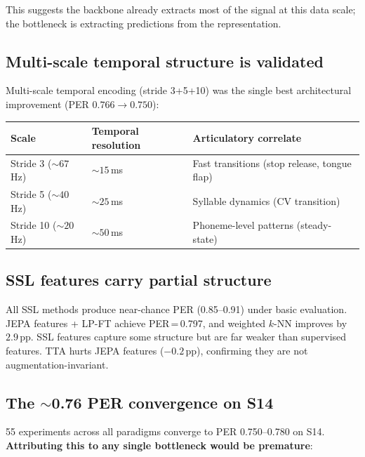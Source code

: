 \documentclass[11pt,letterpaper]{article}
\newcommand{\pp}{\,\text{pp}}
\begin{document}
\noindent This suggests the backbone already extracts most of the signal at this data scale; the bottleneck is extracting predictions from the representation.

\subsection{Multi-scale temporal structure is validated}

Multi-scale temporal encoding (stride 3+5+10) was the single best architectural improvement (PER $0.766 \to 0.750$):

\begin{table}[h]
\centering\small
\begin{tabular}{@{}lll@{}}
\toprule
\textbf{Scale} & \textbf{Temporal resolution} & \textbf{Articulatory correlate} \\
\midrule
Stride 3 (${\sim}67$\,Hz) & ${\sim}15$\,ms & Fast transitions (stop release, tongue flap) \\
Stride 5 (${\sim}40$\,Hz) & ${\sim}25$\,ms & Syllable dynamics (CV transition) \\
Stride 10 (${\sim}20$\,Hz) & ${\sim}50$\,ms & Phoneme-level patterns (steady-state) \\
\bottomrule
\end{tabular}
\end{table}

\subsection{SSL features carry partial structure}

All SSL methods produce near-chance PER (0.85--0.91) under basic evaluation. JEPA features + LP-FT achieve PER\,=\,0.797, and weighted $k$-NN improves by $2.9\pp$. SSL features capture some structure but are far weaker than supervised features. TTA hurts JEPA features ($-0.2\pp$), confirming they are not augmentation-invariant.

\subsection{The ${\sim}$0.76 PER convergence on S14}\label{sec:wall}

55 experiments across all paradigms converge to PER 0.750--0.780 on S14. \textbf{Attributing this to any single bottleneck would be premature}:
\end{document}
